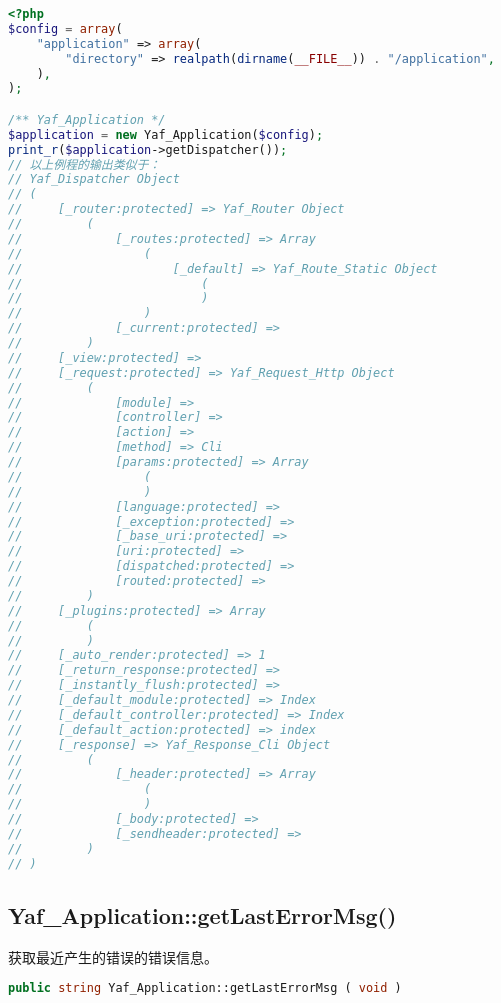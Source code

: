 \begin{lstlisting}[language=PHP]
<?php
$config = array(
    "application" => array(
        "directory" => realpath(dirname(__FILE__)) . "/application",
    ),
);

/** Yaf_Application */
$application = new Yaf_Application($config);
print_r($application->getDispatcher());
// 以上例程的输出类似于：
// Yaf_Dispatcher Object
// (
//     [_router:protected] => Yaf_Router Object
//         (
//             [_routes:protected] => Array
//                 (
//                     [_default] => Yaf_Route_Static Object
//                         (
//                         )
//                 )
//             [_current:protected] => 
//         )
//     [_view:protected] => 
//     [_request:protected] => Yaf_Request_Http Object
//         (
//             [module] => 
//             [controller] => 
//             [action] => 
//             [method] => Cli
//             [params:protected] => Array
//                 (
//                 )
//             [language:protected] => 
//             [_exception:protected] => 
//             [_base_uri:protected] => 
//             [uri:protected] => 
//             [dispatched:protected] => 
//             [routed:protected] => 
//         )
//     [_plugins:protected] => Array
//         (
//         )
//     [_auto_render:protected] => 1
//     [_return_response:protected] => 
//     [_instantly_flush:protected] => 
//     [_default_module:protected] => Index
//     [_default_controller:protected] => Index
//     [_default_action:protected] => index
//     [_response] => Yaf_Response_Cli Object
//         (
//             [_header:protected] => Array
//                 (
//                 )
//             [_body:protected] => 
//             [_sendheader:protected] => 
//         )
// )
\end{lstlisting}



\subsection{Yaf\_Application::getLastErrorMsg()}

获取最近产生的错误的错误信息。






\begin{lstlisting}[language=PHP]
public string Yaf_Application::getLastErrorMsg ( void )
\end{lstlisting}

